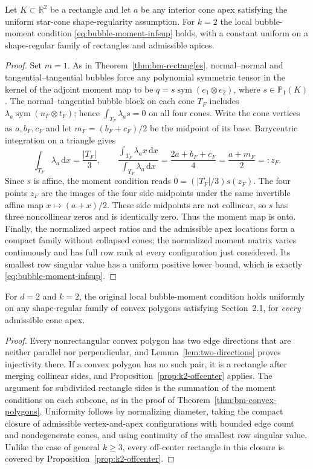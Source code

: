 \documentclass[review,hidelinks,onefignum,onetabnum]{siamart251216}
\newcommand{\sym}{\operatorname{sym}}
\begin{document}
\begin{proposition}[Arbitrary cone apex on a rectangle for $k=2$]
\label{prop:k2-offcenter}
Let $K\subset\mathbb R^2$ be a rectangle and let $a$ be any interior
cone apex satisfying the uniform star-cone shape-regularity assumption.
For $k=2$ the local bubble-moment condition
\eqref{eq:bubble-moment-infsup} holds, with a constant uniform on a
shape-regular family of rectangles and admissible apices.
\end{proposition}
\begin{proof}
Set $m=1$. As in Theorem~\ref{thm:bm-rectangles}, normal--normal
and tangential--tangential bubbles force any polynomial symmetric
tensor in the kernel of the adjoint moment map to be
$q=s\sym(e_1\otimes e_2)$, where $s\in\mathbb P_1(K)$.
The normal--tangential bubble block on each cone $T_F$ includes
$\lambda_a\sym(n_F\otimes t_F)$; hence
\(\int_{T_F}\lambda_a s=0\) on all four cones.
Write the cone vertices as $a,b_F,c_F$ and let
$m_F=(b_F+c_F)/2$ be the midpoint of its base.
Barycentric integration on a triangle gives
\[
\int_{T_F}\lambda_a\,\mathrm dx=\frac{|T_F|}{3},
\qquad
\frac{\int_{T_F}\lambda_a x\,\mathrm dx}
{\int_{T_F}\lambda_a\,\mathrm dx}
=\frac{2a+b_F+c_F}{4}=\frac{a+m_F}{2}=:z_F.
\]
Since $s$ is affine, the moment condition reads
$0=(|T_F|/3)s(z_F)$.
The four points $z_F$ are the images of the four side midpoints
under the same invertible affine map $x\mapsto(a+x)/2$.
These side midpoints are not collinear, so $s$ has three
noncollinear zeros and is identically zero. Thus the moment map is onto.
Finally, the normalized aspect ratios and the admissible apex locations
form a compact family without collapsed cones; the normalized
moment matrix varies continuously and has full row rank at every
configuration just considered. Its smallest row singular value has a
uniform positive lower bound, which is exactly
\eqref{eq:bubble-moment-infsup}.
\end{proof}

\begin{corollary}[Convex polygons for $k=2$, any admissible apex]
\label{cor:k2-any-apex}
For $d=2$ and $k=2$, the original local bubble-moment condition
holds uniformly on any shape-regular family of convex polygons
satisfying Section~2.1, for \emph{every} admissible cone apex.
\end{corollary}
\begin{proof}
Every nonrectangular convex polygon has two edge directions that
are neither parallel nor perpendicular, and Lemma~\ref{lem:two-directions}
proves injectivity there. If a convex polygon has no such pair,
it is a rectangle after merging collinear sides, and
Proposition~\ref{prop:k2-offcenter} applies. The argument for subdivided
rectangle sides is the summation of the moment conditions on each
subcone, as in the proof of Theorem~\ref{thm:bm-convex-polygons}.
Uniformity follows by normalizing diameter, taking the compact
closure of admissible vertex-and-apex configurations with bounded
edge count and nondegenerate cones, and using continuity of the
smallest row singular value. Unlike the case of general $k\ge3$,
every off-center rectangle in this closure is covered by
Proposition~\ref{prop:k2-offcenter}.
\end{proof}
\end{document}
